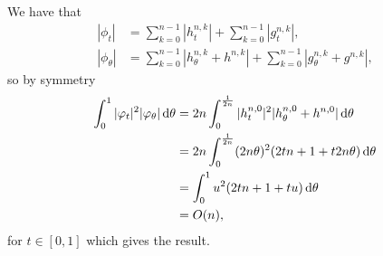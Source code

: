 \message{ !name(mainfile.tex)}\documentclass[a4,danish]{article}
\begin{document}
We have that
\begin{equation*}
  \begin{aligned}
    |\phi_t| & = \sum_{k=0}^{n-1} |h^{n,k}_t| + \sum_{k=0}^{n-1}
    |g^{n,k}_t|, \\
    |\phi_{\theta}| & = \sum_{k=0}^{n-1} |h^{n,k}_{\theta} + h^{n,k} | +
    \sum_{k=0}^{n-1}
    |g^{n,k}_{\theta} + g^{n,k} |,
  \end{aligned}
\end{equation*}
so by symmetry
\begin{equation*}
  \begin{aligned}
    \int_{0}^{1}
    |\varphi_t|^2   |\varphi_{\theta}|
    \mathop{}\!\mathrm{d} \theta
    & =
    2n \int_{0}^{\frac{1}{2n}} |h^{n,0}_t|^2 |h^{n,0}_{\theta} + h^{n,0} |
    \mathop{}\!\mathrm{d} \theta \\
    & = 2n \int_{0}^{\frac{1}{2n}}
    (2n\theta)^2(2tn+1+t2n\theta) \mathop{}\!\mathrm{d} \theta \\
    & = \int_{0}^1
    u^2(2tn+1+t u) \mathop{}\!\mathrm{d} \theta \\
    & = O(n),
  \end{aligned}
\end{equation*}
for $t\in[0,1]$ which gives the result.



\end{document}
